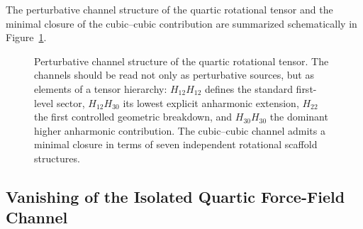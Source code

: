 \documentclass[aip,jcp,reprint]{revtex4-2}
\begin{document}
The perturbative channel structure of the quartic rotational tensor
and the minimal closure of the cubic--cubic contribution are summarized
schematically in Figure~\ref{fig:channels}.

\begin{figure}[t]
\centering
{}

\caption{
Perturbative channel structure of the quartic rotational tensor.
The channels should be read not only as perturbative sources, but as
elements of a tensor hierarchy: $H_{12}H_{12}$ defines the standard
first-level sector, $H_{12}H_{30}$ its lowest explicit anharmonic
extension, $H_{22}$ the first controlled geometric breakdown, and
$H_{30}H_{30}$ the dominant higher anharmonic contribution. The
cubic--cubic channel admits a minimal closure in terms of seven
independent rotational scaffold structures.
}

\label{fig:channels}
\end{figure}

\subsection{Vanishing of the Isolated Quartic Force-Field Channel}
\end{document}
